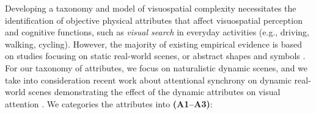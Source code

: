 \documentclass[a4paper]{article}
\begin{document}
Developing a taxonomy and model of visuospatial complexity necessitates the identification of objective physical attributes that affect visuospatial perception and cognitive functions, such as \emph{visual search} in everyday activities (e.g., driving, walking, cycling). However, the majority of existing empirical evidence is based on studies focusing on static real-world scenes, or abstract shapes and symbols \cite{Forsythe2009, Harper2009, Gartus2017}. For our taxonomy of attributes, we focus on naturalistic dynamic scenes, and we take into consideration recent work about attentional synchrony on dynamic real-world scenes demonstrating the effect of the dynamic attributes on visual attention \cite{Smith2013, Mital2011}. We categories the attributes into {\small\sffamily\textbf{(A1--A3)}}:
\end{document}
